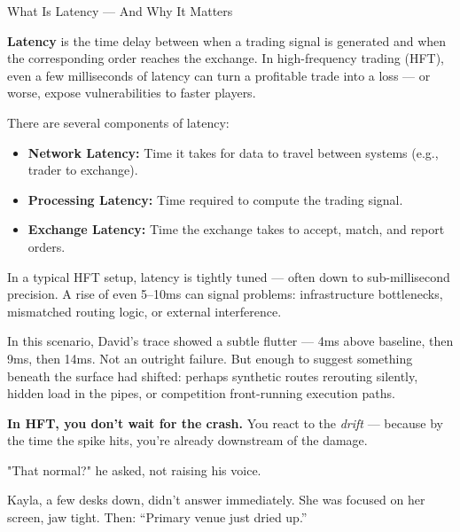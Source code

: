 \begin{TechnicalSidebar}{What Is Latency — And Why It Matters}

  \textbf{Latency} is the time delay between when a trading signal is generated and when the corresponding order 
  reaches the exchange.  
  In high-frequency trading (HFT), even a few milliseconds of latency can turn a profitable trade into a loss — 
  or worse, expose vulnerabilities to faster players.
  
  \medskip
  
  There are several components of latency:
  \begin{itemize}
    \item \textbf{Network Latency:} Time it takes for data to travel between systems (e.g., trader to exchange).
    \item \textbf{Processing Latency:} Time required to compute the trading signal.
    \item \textbf{Exchange Latency:} Time the exchange takes to accept, match, and report orders.
  \end{itemize}
  
  \medskip
  
  In a typical HFT setup, latency is tightly tuned — often down to sub-millisecond precision.  
  A rise of even 5–10ms can signal problems: infrastructure bottlenecks, mismatched routing logic, or external interference.
  
  \medskip
  
  In this scenario, David’s trace showed a subtle flutter — 4ms above baseline, then 9ms, then 14ms.  
  Not an outright failure. But enough to suggest something beneath the surface had shifted:  
  perhaps synthetic routes rerouting silently, hidden load in the pipes, or competition front-running execution paths.
  
  \medskip
  
  \textbf{In HFT, you don’t wait for the crash.}  
  You react to the \textit{drift} — because by the time the spike hits, you’re already downstream of the damage.
  
\end{TechnicalSidebar}

\medskip

"That normal?" he asked, not raising his voice.

Kayla, a few desks down, didn’t answer immediately. She was focused on her screen, jaw tight. Then:
“Primary venue just dried up.”


\medskip

